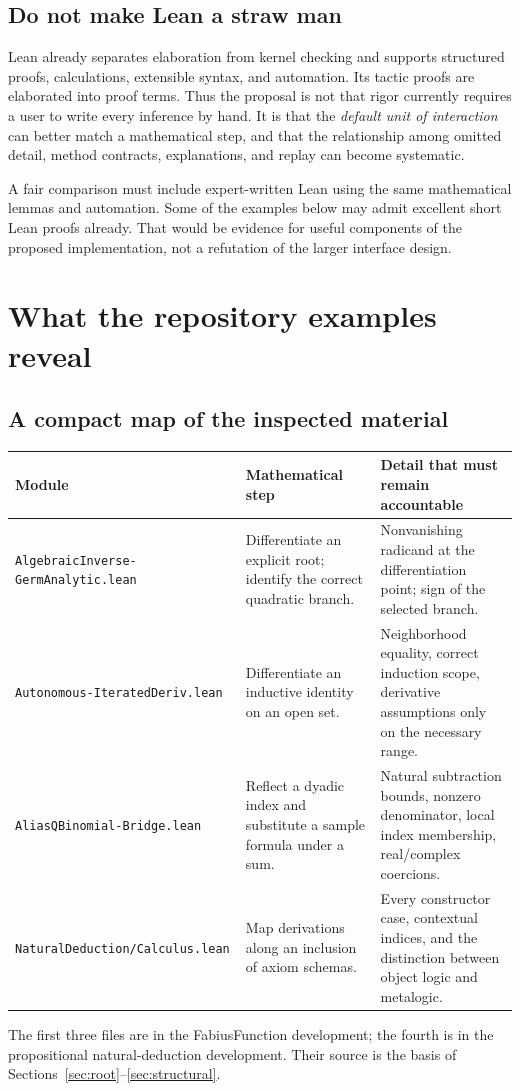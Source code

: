 \documentclass[11pt,a4paper]{article}
\theoremstyle{remark}
\newcommand{\ty}[1]{\texttt{#1}}
\begin{document}
\subsection{Do not make Lean a straw man}
Lean already separates elaboration from kernel checking and supports structured proofs, calculations, extensible syntax, and automation. Its tactic proofs are elaborated into proof terms.\cite{lean-elaboration,lean-tactics} Thus the proposal is not that rigor currently requires a user to write every inference by hand. It is that the \emph{default unit of interaction} can better match a mathematical step, and that the relationship among omitted detail, method contracts, explanations, and replay can become systematic.

A fair comparison must include expert-written Lean using the same mathematical lemmas and automation. Some of the examples below may admit excellent short Lean proofs already. That would be evidence for useful components of the proposed implementation, not a refutation of the larger interface design.

\section{What the repository examples reveal}\label{sec:evidence}

\subsection{A compact map of the inspected material}
\begin{longtable}{@{}L{.23\linewidth}L{.34\linewidth}L{.37\linewidth}@{}}
\toprule
Module & Mathematical step & Detail that must remain accountable\\
\midrule
\endhead
\ty{AlgebraicInverse-}\newline\ty{GermAnalytic.lean} & Differentiate an explicit root; identify the correct quadratic branch. & Nonvanishing radicand at the differentiation point; sign of the selected branch.\\[4pt]
\ty{Autonomous-}\newline\ty{IteratedDeriv.lean} & Differentiate an inductive identity on an open set. & Neighborhood equality, correct induction scope, derivative assumptions only on the necessary range.\\[4pt]
\ty{AliasQBinomial-}\newline\ty{Bridge.lean} & Reflect a dyadic index and substitute a sample formula under a sum. & Natural subtraction bounds, nonzero denominator, local index membership, real/complex coercions.\\[4pt]
\ty{NaturalDeduction/}\newline\ty{Calculus.lean} & Map derivations along an inclusion of axiom schemas. & Every constructor case, contextual indices, and the distinction between object logic and metalogic.\\
\bottomrule
\end{longtable}
The first three files are in the FabiusFunction development; the fourth is in the propositional natural-deduction development. Their source is the basis of Sections~\ref{sec:root}--\ref{sec:structural}.\cite{proveit-root,proveit-ode,proveit-alias,proveit-nd}
\end{document}
